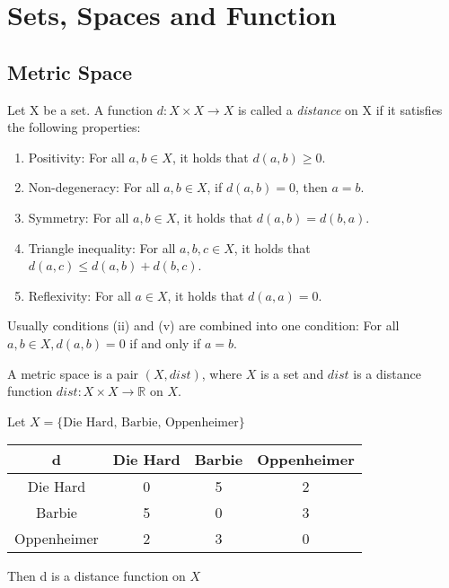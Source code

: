 \section{Sets, Spaces and Function}

\subsection{Metric Space}
\begin{definition}[distance]
    Let X be a set. A function $d: X \times X \to X$ is called a
    \emph{distance} on X if it satisfies the following properties:
    \begin{enumerate}[label=(\roman*)]
        \item Positivity: For all $a,b \in X$, it holds that $d(a,b) \ge 0$.
        \item Non-degeneracy: For all $a,b \in X$, if $d(a,b) = 0$, then $a = b$.
        \item Symmetry: For all $a,b \in X$, it holds that $d(a,b) = d(b,a)$.
        \item Triangle inequality: For all $a,b,c \in X$, it holds that $d(a,c) \le d(a,b) + d(b,c)$.
        \item Reflexivity: For all $a \in X$, it holds that $d(a,a) = 0$.
    \end{enumerate}
\end{definition}

Usually conditions (ii) and (v) are combined into one condition: For all $a,b
\in X, d(a,b) = 0$ if and only if $a = b$.


\begin{definition}
    A metric space is a pair $(X,dist)$, where $X$ is a set and $dist$ is a
    distance function $dist: X \times X \to \mathbb{R}$ on $X$.
\end{definition}

\begin{example}
    Let $ X = \{\text{Die Hard, Barbie, Oppenheimer} \}$

    \begin{table}[h]
        \centering
        \begin{tabular}{c|c|c|c|}
            \cline{2-4}
            d & Die Hard & Barbie & Oppenheimer \\ \hline
            \multicolumn{1}{|c|}{Die Hard}      & 0 & 5 & 2 \\ \hline
            \multicolumn{1}{|c|}{Barbie}        & 5 & 0 & 3 \\ \hline
            \multicolumn{1}{|c|}{Oppenheimer}   & 2 & 3 & 0 \\ \hline
        \end{tabular}
    \end{table}


    Then d is a distance function on $X$
\end{example}

